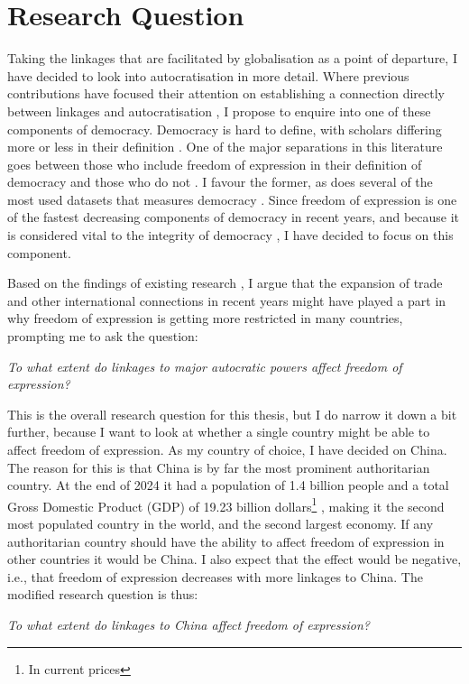 \section{Research Question}
Taking the linkages that are facilitated by globalisation as a point of departure, I have decided to look into autocratisation in more detail. Where previous contributions have focused their attention on establishing a connection directly between linkages and autocratisation \cite{bader_china_2015}, I propose to enquire into one of these components of democracy. Democracy is hard to define, with scholars differing more or less in their definition \citep{dahl_polyarchy_1971, dahl_democracy_1989, schumpeter_capitalism_2010, przeworski_democracy_1991}. One of the major separations in this literature goes between those who include freedom of expression in their definition of democracy \citep{dahl_polyarchy_1971} and those who do not \citep{schumpeter_capitalism_2010, przeworski_democracy_1991}. I favour the former, as does several of the most used datasets that measures democracy \citep{economist_intelligence_unit_democracy_2024, freedom_house_freedom_2024, marshall_polity5_2020, coppedge_v-dem_2024-1}. Since freedom of expression is one of the fastest decreasing components of democracy in recent years\citep{nord_democracy_2025}, and because it is considered vital to the integrity of democracy \citep{dahl_polyarchy_1971}, I have decided to focus on this component.  

Based on the findings of existing research \citep{ambrosio_constructing_2010, gamso_is_2021, levitsky_linkage_2006, luhrmann_third_2019}, I argue that the expansion of trade and other international connections in recent years might have played a part in why freedom of expression is getting more restricted in many countries, prompting me to ask the question:
\begin{displayquote}
    \textit{To what extent do linkages to major autocratic powers affect freedom of expression?}
    \label{rq:general}
\end{displayquote}
This is the overall research question for this thesis, but I do narrow it down a bit further, because I want to look at whether a single country might be able to affect freedom of expression. As my country of choice, I have decided on China. The reason for this is that China is by far the most prominent authoritarian country. At the end of 2024 it had a population of 1.4 billion people \citep{guojia_tongjiju_national_bureau_of_statistics_zong_2024} and a total Gross Domestic Product (GDP) of 19.23 billion dollars\footnote{In current prices} \citep{imf_world_2025}, making it the second most populated country in the world, and the second largest economy. If any authoritarian country should have the ability to affect freedom of expression in other countries it would be China. I also expect that the effect would be negative, i.e., that freedom of expression decreases with more linkages to China. The modified research question is thus:
\begin{displayquote}
    \textit{To what extent do linkages to China affect freedom of expression?}
    \label{rq:specific}
\end{displayquote}


